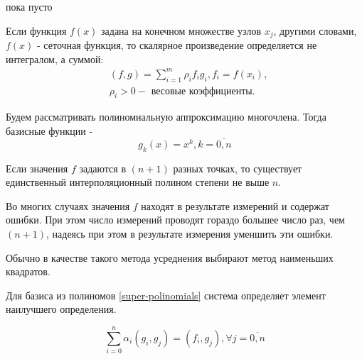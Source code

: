 \begin{col-answer-preambule}
	\begin{plan}
    \item пока пусто
	\end{plan}
\end{col-answer-preambule}


Если функция $f(x)$ задана на конечном множестве узлов $x_j$, другими
словами, $f(x)$ - сеточная функция, то скалярное произведение определяется не
интегралом, а суммой:
\begin{equation}
  \begin{split}
    &(f, g) = \sum\limits_{i = 1}^m\rho_i f_i g_i, f_i = f(x_i),\\
    & \rho_i > 0 - \text{ весовые коэффициенты}.
  \end{split}
\end{equation}

Будем рассматривать полиномиальную аппроксимацию многочлена. Тогда базисные
функции -
\begin{equation}
  \label{super-polinomials}
  g_k(x) = x^k, k = \overline{0, n}
\end{equation}

Если значения $f$ задаются в $(n + 1)$ разных точках, то существует единственный
интерполяционный полином степени не выше $n$.

Во многих случаях значения $f$ находят в результате измерений и содержат ошибки.
При этом число измерений проводят гораздо большее число раз, чем $(n + 1)$,
надеясь при этом в результате измерения уменшить эти ошибки.

Обычно в качестве такого метода усреднения выбирают метод наименьших квадратов.

Для базиса из полиномов \eqref{super-polinomials} система определяет элемент
наилучшего определения.

\begin{equation}
  \label{14-system}
  \sum\limits_{i = 0}^n \alpha_i(g_i, g_j) = (f_i, g_j), \forall j = \overline{0, n}
\end{equation}

